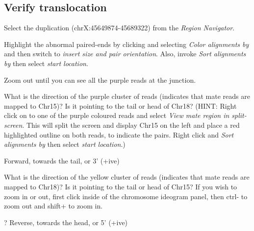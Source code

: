 \subsection{Verify translocation}
\begin{advanced}

\begin{steps}
Select the duplication (chrX:45649874-45689322) from the \emph{Region Navigator}. 

Highlight the abnormal paired-ends by clicking and selecting \emph{Color alignments by} and then switch to \emph{insert size and pair orientation}. Also, invoke \emph{Sort alignments by} then select \emph{start location}.

Zoom out until you can see all the purple reads at the junction.
\end{steps}
\end{advanced}


\begin{questions}
What is the direction of the purple cluster of reads (indicates that mate reads are mapped to Chr15)? Is it pointing to the tail or head of Chr18? 
(HINT: Right click on to one of the purple coloured reads and select \emph{View mate region in split-screen}. This will split the screen and display Chr15 on the left and place a red highlighted outline on both reads, to indicate the pairs. Right click and \emph{Sort alignments by} then select \emph{start location}.)
\begin{answer}
Forward, towards the tail, or 3’ (+ive)
\end{answer}
\end{questions}

\begin{questions}
What is the direction of the yellow cluster of reads (indicates that mate reads are mapped to Chr18)? Is it pointing to the tail or head of Chr15? \newline
If you wish to zoom in or out, first click inside of the chromosome ideogram panel, then ctrl- to zoom out and shift+ to zoom in. 
\begin{answer}
? Reverse, towards the head, or 5’ (+ive)
\end{answer}
\end{questions}

